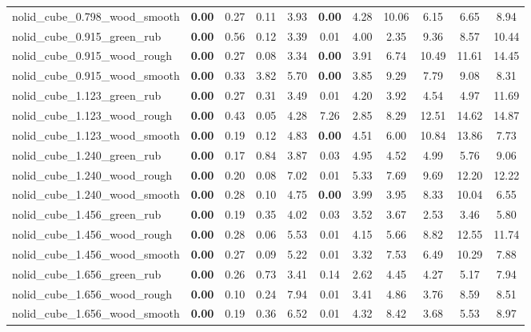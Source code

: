 \begin{table}[H]
{\begin{tabular}{l cccccccccc}
        nolid\_cube\_0.798\_wood\_smooth & \textbf{0.00} & 0.27 & 0.11 & 3.93 & \textbf{0.00} & 4.28 & 10.06 & 6.15 & 6.65 & 8.94 \\
        nolid\_cube\_0.915\_green\_rub & \textbf{0.00} & 0.56 & 0.12 & 3.39 & 0.01 & 4.00 & 2.35 & 9.36 & 8.57 & 10.44 \\
        nolid\_cube\_0.915\_wood\_rough & \textbf{0.00} & 0.27 & 0.08 & 3.34 & \textbf{0.00} & 3.91 & 6.74 & 10.49 & 11.61 & 14.45 \\
        nolid\_cube\_0.915\_wood\_smooth & \textbf{0.00} & 0.33 & 3.82 & 5.70 & \textbf{0.00} & 3.85 & 9.29 & 7.79 & 9.08 & 8.31 \\
        nolid\_cube\_1.123\_green\_rub & \textbf{0.00} & 0.27 & 0.31 & 3.49 & 0.01 & 4.20 & 3.92 & 4.54 & 4.97 & 11.69 \\
        nolid\_cube\_1.123\_wood\_rough & \textbf{0.00} & 0.43 & 0.05 & 4.28 & 7.26 & 2.85 & 8.29 & 12.51 & 14.62 & 14.87 \\
        nolid\_cube\_1.123\_wood\_smooth & \textbf{0.00} & 0.19 & 0.12 & 4.83 & \textbf{0.00} & 4.51 & 6.00 & 10.84 & 13.86 & 7.73 \\
        nolid\_cube\_1.240\_green\_rub & \textbf{0.00} & 0.17 & 0.84 & 3.87 & 0.03 & 4.95 & 4.52 & 4.99 & 5.76 & 9.06 \\
        nolid\_cube\_1.240\_wood\_rough & \textbf{0.00} & 0.20 & 0.08 & 7.02 & 0.01 & 5.33 & 7.69 & 9.69 & 12.20 & 12.22 \\
        nolid\_cube\_1.240\_wood\_smooth & \textbf{0.00} & 0.28 & 0.10 & 4.75 & \textbf{0.00} & 3.99 & 3.95 & 8.33 & 10.04 & 6.55 \\
        nolid\_cube\_1.456\_green\_rub & \textbf{0.00} & 0.19 & 0.35 & 4.02 & 0.03 & 3.52 & 3.67 & 2.53 & 3.46 & 5.80 \\
        nolid\_cube\_1.456\_wood\_rough & \textbf{0.00} & 0.28 & 0.06 & 5.53 & 0.01 & 4.15 & 5.66 & 8.82 & 12.55 & 11.74 \\
        nolid\_cube\_1.456\_wood\_smooth & \textbf{0.00} & 0.27 & 0.09 & 5.22 & 0.01 & 3.32 & 7.53 & 6.49 & 10.29 & 7.88 \\
        nolid\_cube\_1.656\_green\_rub & \textbf{0.00} & 0.26 & 0.73 & 3.41 & 0.14 & 2.62 & 4.45 & 4.27 & 5.17 & 7.94 \\
        nolid\_cube\_1.656\_wood\_rough & \textbf{0.00} & 0.10 & 0.24 & 7.94 & 0.01 & 3.41 & 4.86 & 3.76 & 8.59 & 8.51 \\
        nolid\_cube\_1.656\_wood\_smooth & \textbf{0.00} & 0.19 & 0.36 & 6.52 & 0.01 & 4.32 & 8.42 & 3.68 & 5.53 & 8.97 \\

\end{tabular}}
\end{table}
